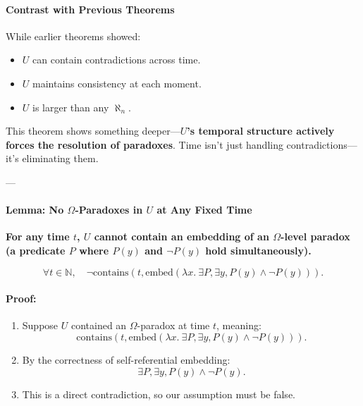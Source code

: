 \documentclass[12pt]{article}
\begin{document}
\paragraph{Contrast with Previous Theorems}
While earlier theorems showed:
\begin{itemize}
    \item \( U \) can contain contradictions across time.
    \item \( U \) maintains consistency at each moment.
    \item \( U \) is larger than any \( \aleph_n \).
\end{itemize}
This theorem shows something deeper—\textbf{\( U \)'s temporal structure actively forces the resolution of paradoxes}. Time isn’t just handling contradictions—it’s eliminating them.

---

\paragraph{Lemma: No \( \Omega \)-Paradoxes in \( U \) at Any Fixed Time}
\textbf{For any time \( t \), \( U \) cannot contain an embedding of an \( \Omega \)-level paradox (a predicate \( P \) where \( P(y) \) and \( \neg P(y) \) hold simultaneously).}

\begin{equation}
    \forall t \in \mathbb{N}, \quad
    \neg \text{contains}(t, \text{embed}(\lambda x.\ \exists P, \exists y, P(y) \wedge \neg P(y))).
\end{equation}

\paragraph{Proof:}
\begin{enumerate}
    \item Suppose \( U \) contained an \( \Omega \)-paradox at time \( t \), meaning:
    \[
    \text{contains}(t, \text{embed}(\lambda x.\ \exists P, \exists y, P(y) \wedge \neg P(y))).
    \]
    \item By the correctness of self-referential embedding:
    \[
    \exists P, \exists y, P(y) \wedge \neg P(y).
    \]
    \item This is a direct contradiction, so our assumption must be false.
\end{enumerate}
\end{document}

